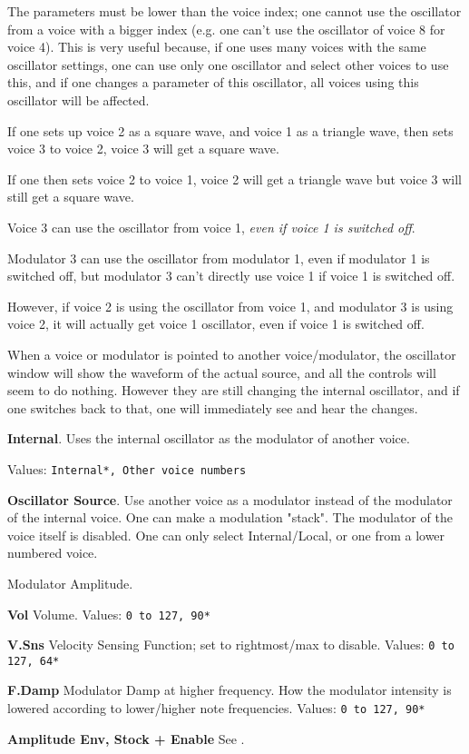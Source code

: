    The parameters must be lower than the voice index; one cannot use the
   oscillator from a voice with a bigger index (e.g. one can't use the
   oscillator of voice 8 for voice 4). This is very useful because, if
   one uses many voices with the same oscillator settings, one can use only
   one oscillator and select other voices to use this, and if one changes a
   parameter of this oscillator, all voices using this oscillator will be
   affected.

   If one sets up voice 2 as a square wave, and voice 1 as a triangle wave,
   then sets voice 3 to voice 2, voice 3 will get a square wave.

   If one then sets voice 2 to voice 1, voice 2 will get a triangle wave but
   voice 3 will still get a square wave.

   Voice 3 can use the oscillator from voice 1,
   \textsl{even if voice 1 is switched off}.

   Modulator 3 can use the oscillator from modulator 1, even if modulator 1 is
   switched off, but modulator 3 can't directly use voice 1 if voice 1 is
   switched off.

   However, if voice 2 is using the oscillator from voice 1, and modulator 3 is
   using voice 2, it will actually get voice 1 oscillator, even if voice 1 is
   switched off.

   When a voice or modulator is pointed to another voice/modulator, the
   oscillator window will show the waveform of the actual source, and all the
   controls will seem to do nothing. However they are still changing the
   internal oscillator, and if one switches back to that, one will immediately
   see and hear the changes.

   \textbf{Internal}.
   Uses the internal oscillator as the modulator of another voice.

   Values: \texttt{Internal*, Other voice numbers}

   \textbf{Oscillator Source}.
   Use another voice as a modulator instead of the modulator of the internal
   voice. One can make a modulation "stack". The modulator of the voice itself
   is disabled.
   One can only select Internal/Local, or one from a lower numbered voice.

   Modulator Amplitude.

   \begin{enumber}
      \item \textbf{Vol}
         Volume.
         Values: \texttt{0 to 127, 90*}
      \item \textbf{V.Sns}
         Velocity Sensing Function; set to rightmost/max to disable.
         Values: \texttt{0 to 127, 64*}
      \item \textbf{F.Damp}
         Modulator Damp at higher frequency.
         How the modulator intensity is lowered according to lower/higher
         note frequencies. 
         Values: \texttt{0 to 127, 90*}
      \item \textbf{Amplitude Env, Stock + Enable}
         See .
   \end{enumber}

